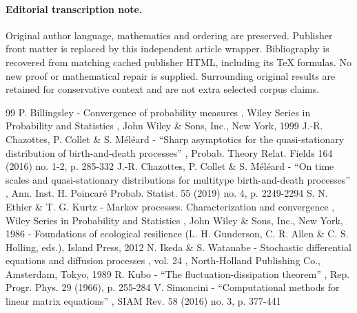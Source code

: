\documentclass[11pt]{article}
\begin{document}
\paragraph{Editorial transcription note.}
Original author language, mathematics and ordering are preserved. Publisher front matter is replaced by this independent article wrapper. Bibliography is recovered from matching cached publisher HTML, including its TeX formulas. No new proof or mathematical repair is supplied. Surrounding original results are retained for conservative context and are not extra selected corpus claims.
\clearpage

\begin{thebibliography}{99}
 P. Billingsley - Convergence of probability measures , Wiley Series in Probability and Statistics , John Wiley \& Sons, Inc., New York, 1999
 J.-R. Chazottes, P. Collet \& S. Méléard - “Sharp asymptotics for the quasi-stationary distribution of birth-and-death processes” , Probab. Theory Relat. Fields 164 (2016) no. 1-2, p. 285-332
 J.-R. Chazottes, P. Collet \& S. Méléard - “On time scales and quasi-stationary distributions for multitype birth-and-death processes” , Ann. Inst. H. Poincaré Probab. Statist. 55 (2019) no. 4, p. 2249-2294
 S. N. Ethier \& T. G. Kurtz - Markov processes. Characterization and convergence , Wiley Series in Probability and Statistics , John Wiley \& Sons, Inc., New York, 1986
 - Foundations of ecological resilience (L. H. Gunderson, C. R. Allen \& C. S. Holling, eds.), Island Press, 2012
 N. Ikeda \& S. Watanabe - Stochastic differential equations and diffusion processes , vol. 24 , North-Holland Publishing Co., Amsterdam, Tokyo, 1989
 R. Kubo - “The fluctuation-dissipation theorem” , Rep. Progr. Phys. 29 (1966), p. 255-284
 V. Simoncini - “Computational methods for linear matrix equations” , SIAM Rev. 58 (2016) no. 3, p. 377-441
\end{thebibliography}
\end{document}
